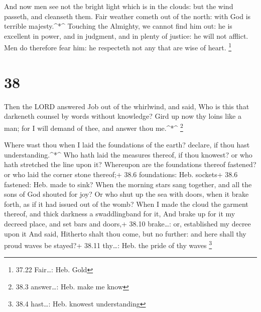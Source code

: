  And now men see not the bright light which is in the
clouds: but the wind passeth, and cleanseth them.  Fair
weather cometh out of the north: with God is terrible majesty.\^{}*\^{}
 Touching the Almighty, we cannot find him out: he is
excellent in power, and in judgment, and in plenty of justice: he will
not afflict.  Men do therefore fear him: he respecteth not
any that are wise of heart. \footnote{37.22 Fair\ldots: Heb. Gold}

\hypertarget{section-37}{%
\section{38}\label{section-37}}

 Then the LORD answered Job out of the whirlwind, and said,
 Who is this that darkeneth counsel by words without
knowledge?  Gird up now thy loins like a man; for I will
demand of thee, and answer thou me.\^{}*\^{} \footnote{38.3
  answer\ldots: Heb. make me know}

 Where wast thou when I laid the foundations of the earth?
declare, if thou hast understanding.\^{}*\^{}  Who hath laid
the measures thereof, if thou knowest? or who hath stretched the line
upon it?  Whereupon are the foundations thereof fastened? or
who laid the corner stone thereof;+ 38.6 foundations: Heb. sockets+ 38.6
fastened: Heb. made to sink?  When the morning stars sang
together, and all the sons of God shouted for joy?  Or who
shut up the sea with doors, when it brake forth, as if it had issued out
of the womb?  When I made the cloud the garment thereof, and
thick darkness a swaddlingband for it,  And brake up for it
my decreed place, and set bars and doors,+ 38.10 brake\ldots: or,
established my decree upon it  And said, Hitherto shalt
thou come, but no further: and here shall thy proud waves be stayed?+
38.11 thy\ldots: Heb. the pride of thy waves \footnote{38.4 hast\ldots:
  Heb. knowest understanding}


